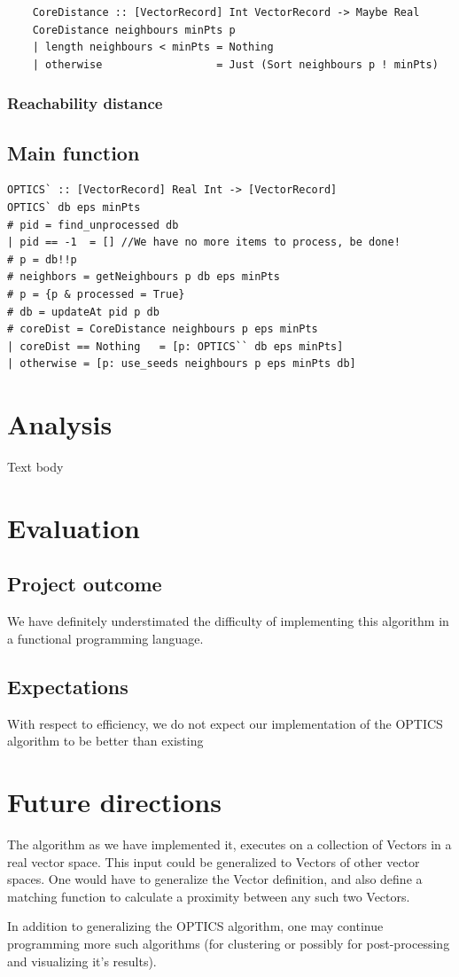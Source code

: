 \documentclass[12pt,a4paper]{article}
\begin{document}
\begin{verbatim}
    CoreDistance :: [VectorRecord] Int VectorRecord -> Maybe Real
    CoreDistance neighbours minPts p
    | length neighbours < minPts = Nothing
    | otherwise                  = Just (Sort neighbours p ! minPts)
\end{verbatim}

\subsubsection{Reachability distance}

\subsection{Main function}
\begin{verbatim}
OPTICS` :: [VectorRecord] Real Int -> [VectorRecord]
OPTICS` db eps minPts
# pid = find_unprocessed db
| pid == -1  = [] //We have no more items to process, be done!
# p = db!!p
# neighbors = getNeighbours p db eps minPts
# p = {p & processed = True}
# db = updateAt pid p db
# coreDist = CoreDistance neighbours p eps minPts
| coreDist == Nothing   = [p: OPTICS`` db eps minPts]
| otherwise = [p: use_seeds neighbours p eps minPts db]
\end{verbatim}

\clearpage
\section{Analysis}
Text body

\section{Evaluation}
\subsection{Project outcome}
We have definitely understimated the difficulty of implementing this algorithm in a functional programming language.
\subsection{Expectations}
With respect to efficiency, we do not expect our implementation of the OPTICS algorithm to be better than existing 

\section{Future directions}
The algorithm as we have implemented it, executes on a collection of Vectors in a real vector space. This input could be generalized to Vectors of other vector spaces. One would have to generalize the Vector definition, and also define a matching function to calculate a proximity between any such two Vectors.

In addition to generalizing the OPTICS algorithm, one may continue programming more such algorithms (for clustering or possibly for post-processing and visualizing it's results).
\end{document}
